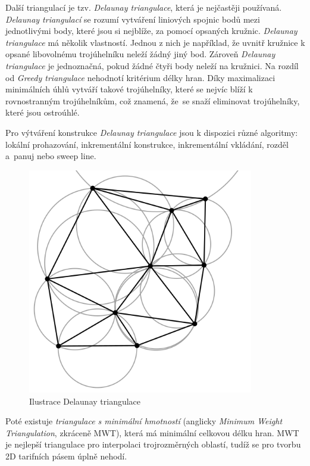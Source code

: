 Další triangulací je tzv. \textit{Delaunay triangulace}, která je nejčastěji používaná.
\textit{Delaunay triangulací} se rozumí vytváření liniových spojnic bodů mezi jednotlivými body, které jsou si nejblíže,
za pomocí opsaných kružnic. \textit{Delaunay triangulace} má několik vlastností. Jednou z nich je například,
že uvnitř kružnice k opsané libovolnému trojúhelníku neleží žádný jiný bod.
Zároveň \textit{Delaunay triangulace} je jednoznačná, pokud žádné čtyři body neleží na kružnici.
Na rozdíl od \textit{Greedy triangulace} nehodnotí kritérium délky hran. Díky maximalizaci minimálních
úhlů vytváří takové trojúhelníky, které se nejvíc blíží k rovnostranným trojúhelníkům, 
což znamená, že~se snaží eliminovat trojúhelníky, které jsou ostroúhlé.

Pro výtváření konstrukce \textit{Delaunay triangulace} jsou k dispozici různé algoritmy: lokální prohazování, 
inkrementální konstrukce, inkrementální vkládání, rozděl a~pa\-nuj nebo sweep line. \cite{bayer-delaunay}

\begin{figure}[H] \centering
    \includegraphics[width=280pt]{./pictures/triangulace-delaunay.png}
    \caption[Ilustrace Delaunay triangulace]{Ilustrace Delaunay triangulace \cite{triangulace-delaunay}}
	\label{fig:triangulace-delaunay}              
\end{figure}

Poté existuje \textit{triangulace s minimální hmotností} (anglicky \textit{Minimum Weight Triangulation}, zkráceně MWT),
která má minimální celkovou délku hran. MWT je nejlepší triangulace pro interpolaci trojrozměrných oblastí,
tudíž se pro tvorbu 2D tarifních pásem úplně nehodí.


